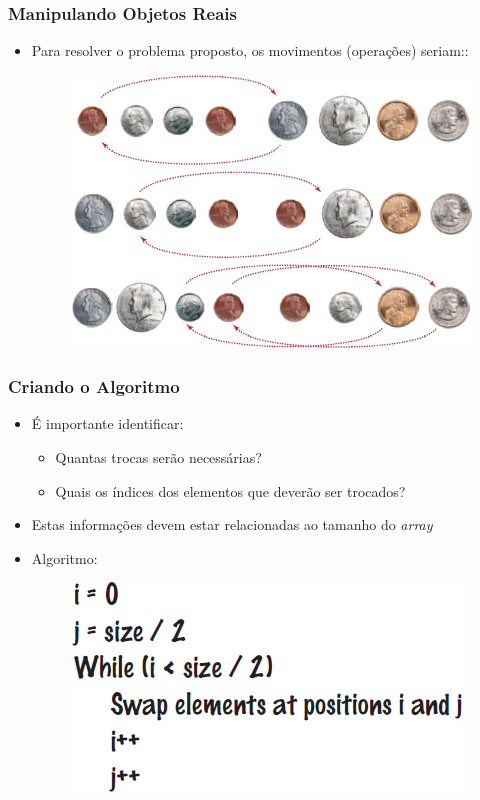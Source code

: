 \documentclass[xcolor={dvipsnames,table},aspectratio=169]{beamer}
\begin{document}
\begin{frame}\frametitle{Manipulando Objetos Reais}
\begin{itemize}
	\item Para resolver o problema proposto, os movimentos (operações) seriam::
\begin{figure}[h]
	\includegraphics[height=0.50\paperheight,center]{pucrs-ep-fprog-unidade_06-arrays-laminas-algoritmo_com_moedas.png}
\end{figure}
\end{itemize}
\end{frame}

\begin{frame}\frametitle{Criando o Algoritmo}
\begin{itemize}
	\item É importante identificar:
	\begin{itemize}
		\item Quantas trocas serão necessárias?
		\item Quais os índices dos elementos que deverão ser trocados?
	\end{itemize}
	\item Estas informações devem estar relacionadas ao tamanho do \emph{array}
	\item Algoritmo:
\begin{figure}[h]
	\includegraphics[height=0.3\paperheight,center]{pucrs-ep-fprog-unidade_06-arrays-laminas-algoritmo_final.png}
\end{figure}
\end{itemize}
\end{frame}
\end{document}
